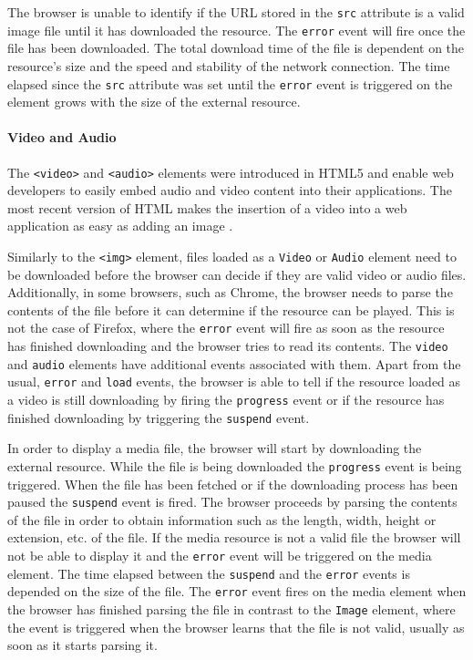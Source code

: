 \documentclass[10pt,a4paper,twoside]{book}
\begin{document}
The browser is unable to identify if the URL stored in the \texttt{src} attribute is a valid image file until it has downloaded the resource. The \texttt{error} event will fire once the file has been downloaded. The total download time of the file is dependent on the resource's size and the speed and stability of the network connection. The time elapsed since the \texttt{src} attribute was set until the \texttt{error} event is triggered on the element grows with the size of the external resource.

\paragraph{Video and Audio}
The \texttt{<video>} and \texttt{<audio>} elements were introduced in HTML5 and enable web developers to easily embed audio and video content into their applications. The most recent version of HTML makes the insertion of a video into a web application as easy as adding an image \cite{berjon2014html}.

Similarly to the \texttt{<img>} element, files loaded as a \texttt{Video} or \texttt{Audio} element need to be downloaded before the browser can decide if they are valid video or audio files. Additionally, in some browsers, such as Chrome, the browser needs to parse the contents of the file before it can determine if the resource can be played. This is not the case of Firefox, where the \texttt{error} event will fire as soon as the resource has finished downloading and the browser tries to read its contents. The \texttt{video} and \texttt{audio} elements have additional events associated with them. Apart from the usual, \texttt{error} and \texttt{load} events, the browser is able to tell if the resource loaded as a video is still downloading by firing the \texttt{progress} event or if the resource has finished downloading by triggering the \texttt{suspend} event. 

In order to display a media file, the browser will start by downloading the external resource. While the file is being downloaded the \texttt{progress} event is being triggered. When the file has been fetched or if the downloading process has been paused the \texttt{suspend} event is fired. The browser proceeds by parsing the contents of the file in order to obtain information such as the length, width, height or extension, etc. of the file. If the media resource is not a valid file the browser will not be able to display it and the \texttt{error} event will be triggered on the media element. The time elapsed between the \texttt{suspend} and the \texttt{error} events is depended on the size of the file. The \texttt{error} event fires on the media element when the browser has finished parsing the file in contrast to the \texttt{Image} element, where the event is triggered when the browser learns that the file is not valid, usually as soon as it starts parsing it\cite{berjon2014html}.
\end{document}
